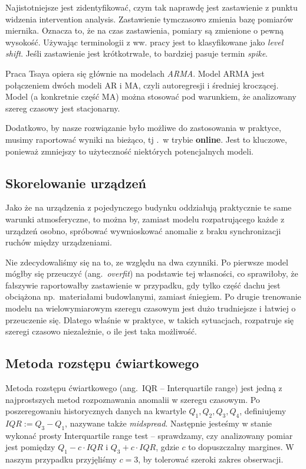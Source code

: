 \documentclass[12pt]{article}
\begin{document}
    Najistotniejsze jest zidentyfikować, czym tak naprawdę jest zastawienie z punktu widzenia intervention analysis.
    Zastawienie tymczasowo zmienia bazę pomiarów miernika. Oznacza to, że na czas zastawienia, pomiary są zmienione o
    pewną wysokość. Używając terminologii z ww. pracy jest to klasyfikowane jako \emph{level shift}. Jeśli
    zastawienie jest krótkotrwałe, to bardziej pasuje termin \emph{spike}.

    Praca Tsaya opiera się głównie na modelach \emph{ARMA}. Model ARMA jest połączeniem dwóch modeli AR i MA, czyli
    autoregresji i średniej kroczącej. Model (a konkretnie część MA) można stosować pod warunkiem, że analizowany
    szereg czasowy jest stacjonarny.

    Dodatkowo, by nasze rozwiązanie było możliwe do zastosowania w praktyce, musimy raportować wyniki na bieżąco, tj
    .\ w trybie \textbf{online}. Jest to kluczowe, ponieważ zmniejszy to użyteczność niektórych potencjalnych modeli.

    \subsection{Skorelowanie urządzeń}
    Jako że na urządzenia z pojedynczego budynku oddziałują praktycznie te same warunki atmosferyczne, to można by,
    zamiast modelu rozpatrującego każde z urządzeń osobno, spróbować wywnioskować anomalie z braku synchronizacji ruchów
    między urządzeniami.

    Nie zdecydowaliśmy się na to, ze względu na dwa czynniki. Po pierwsze model mógłby się przeuczyć (ang.\
    \emph{overfit}) na podstawie tej własności, co sprawiłoby, że fałszywie raportowałby zastawienie w przypadku, gdy
    tylko część dachu jest obciążona np.\ materiałami budowlanymi, zamiast śniegiem. Po drugie trenowanie modelu na
    wielowymiarowym szeregu czasowym jest dużo trudniejsze i łatwiej o przeuczenie się. Dlatego właśnie w praktyce, w
    takich sytuacjach, rozpatruje się szeregi czasowo niezależnie, o ile jest taka możliwość.

    \subsection{Metoda rozstępu ćwiartkowego}
    Metoda rozstępu ćwiartkowego (ang.\ IQR -- Interquartile range) jest jedną z najprostszych metod rozpoznawania
    anomalii w szeregu czasowym. Po poszeregowaniu historycznych danych na kwartyle $Q_1, Q_2, Q_3, Q_4$, definiujemy
    $\mathit{IQR}:= Q_3 - Q_1$, nazywane także \emph{midspread}. Następnie jesteśmy w stanie wykonać prosty
    Interquartile
    range test -- sprawdzamy, czy analizowany pomiar jest pomiędzy $Q_1 - c \cdot \mathit{IQR}$ i $Q_3 + c \cdot
    \mathit{IQR}$, gdzie $c$ to dopuszczalny margines. W naszym przypadku przyjęliśmy $c=3$, by tolerować szeroki zakres
    obserwacji.
\end{document}
